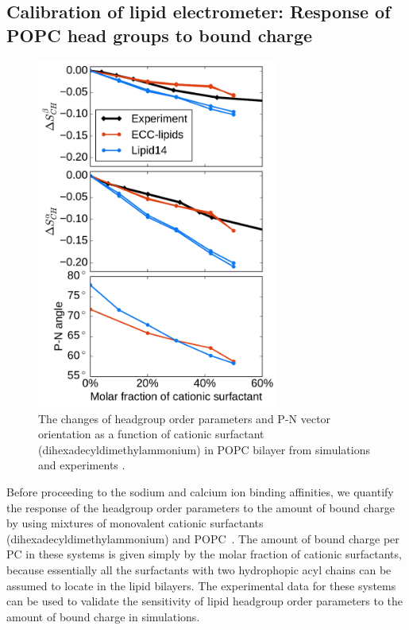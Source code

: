 \documentclass[aip,jcp,twocolumn]{revtex4}
\begin{document}

\subsection{Calibration of lipid electrometer:
            Response of POPC head groups to bound charge}\label{section:boundCHARGE}

\begin{figure}[tb!]
  \centering
  \includegraphics[width=8.0cm]{../Fig/ipython_nb/PN_angle_OrdPars-A-B_L14-ECCL17_q80_sig89_surf.pdf}
  \caption{\label{OrderParameterCHANGESsurf}
    The changes of headgroup order parameters and P-N vector orientation as a function of
    cationic surfactant (dihexadecyldimethylammonium) in POPC bilayer from simulations
    and experiments \cite{scherer89}.
  }
\end{figure}

Before proceeding to the sodium and calcium  ion binding affinities, we quantify
the response of the headgroup order parameters to the amount of 
bound charge by using mixtures of monovalent cationic
surfactants (dihexadecyldimethylammonium)
and POPC~\cite{scherer89}. The amount of bound charge per PC 
in these systems is given simply by the molar fraction of cationic 
surfactants, because essentially all the surfactants with two hydrophopic
acyl chains can be assumed to locate in the lipid bilayers.
The experimental data for these systems can be used to validate 
the sensitivity of lipid headgroup order parameters
to the amount of bound charge in simulations.
\end{document}
